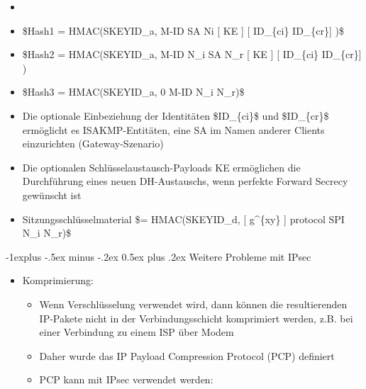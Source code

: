 \documentclass[a4paper]{article}
\makeatletter
\renewcommand{\subsection}{\@startsection{subsection}{2}{0mm}%
 {-1explus -.5ex minus -.2ex}%
 {0.5ex plus .2ex}%
 {\normalfont\normalsize\bfseries}}
\makeatother
\begin{document}
\begin{multicols}{3}
    \begin{itemize}
        \item
        \item
              \$Hash1 = HMAC(SKEYID\_a, M-ID \textbar{} SA \textbar{} Ni \textbar{}
              {[} \textbar{} KE {]} {[} \textbar{} ID\_\{ci\} \textbar{}
              ID\_\{cr\}{]} )\$
        \item
              \$Hash2 = HMAC(SKEYID\_a, M-ID \textbar{} N\_i \textbar{} SA
              \textbar{} N\_r \textbar{} {[} \textbar{} KE {]} {[} \textbar{}
              ID\_\{ci\} \textbar{} ID\_\{cr\}{]} )
        \item
              \$Hash3 = HMAC(SKEYID\_a, 0 \textbar{} M-ID \textbar{} N\_i \textbar{}
              N\_r)\$
        \item
              Die optionale Einbeziehung der Identitäten \$ID\_\{ci\}\$ und
              \$ID\_\{cr\}\$ ermöglicht es ISAKMP-Entitäten, eine SA im Namen
              anderer Clients einzurichten (Gateway-Szenario)
        \item
              Die optionalen Schlüsselaustausch-Payloads KE ermöglichen die
              Durchführung eines neuen DH-Austauschs, wenn perfekte Forward Secrecy
              gewünscht ist
        \item
              Sitzungsschlüsselmaterial \$= HMAC(SKEYID\_d, {[} g\^{}\{xy\}
              \textbar{} {]} protocol \textbar{} SPI \textbar{} N\_i \textbar{}
              N\_r)\$
    \end{itemize}


    \subsection{Weitere Probleme mit
        IPsec}

    \begin{itemize}
        \item
              Komprimierung:

              \begin{itemize}
                  \item
                        Wenn Verschlüsselung verwendet wird, dann können die resultierenden
                        IP-Pakete nicht in der Verbindungsschicht komprimiert werden, z.B.
                        bei einer Verbindung zu einem ISP über Modem
                  \item
                        Daher wurde das IP Payload Compression Protocol (PCP) definiert
                  \item
                        PCP kann mit IPsec verwendet werden:


\end{itemize}
\end{itemize}
\end{multicols}
\end{document}
